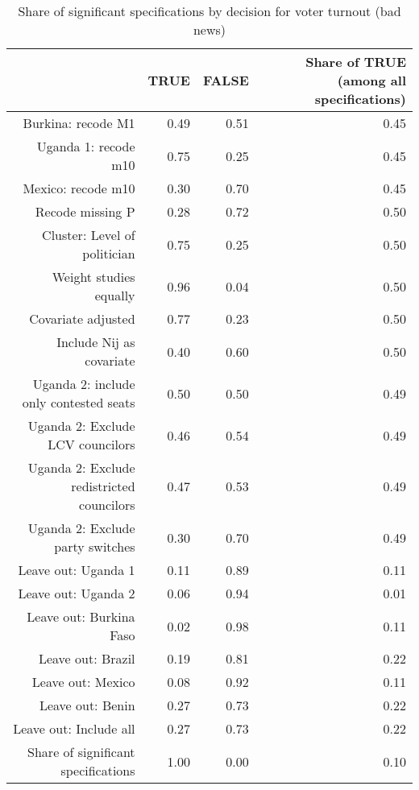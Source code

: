 \begin{table}[ht]
\centering
\caption{Share of significant specifications by decision for voter turnout (bad news)} 
\label{tab:spec_m3b}
\begin{tabular}{rrrr}
  \hline
 & TRUE & FALSE & Share of TRUE (among all specifications) \\ 
  \hline
Burkina: recode M1 & 0.49 & 0.51 & 0.45 \\ 
  Uganda 1: recode m10 & 0.75 & 0.25 & 0.45 \\ 
  Mexico: recode m10 & 0.30 & 0.70 & 0.45 \\ 
  Recode missing P & 0.28 & 0.72 & 0.50 \\ 
  Cluster: Level of politician & 0.75 & 0.25 & 0.50 \\ 
  Weight studies equally & 0.96 & 0.04 & 0.50 \\ 
  Covariate adjusted & 0.77 & 0.23 & 0.50 \\ 
  Include Nij as covariate & 0.40 & 0.60 & 0.50 \\ 
  Uganda 2: include only contested seats & 0.50 & 0.50 & 0.49 \\ 
  Uganda 2: Exclude LCV councilors & 0.46 & 0.54 & 0.49 \\ 
  Uganda 2: Exclude redistricted councilors & 0.47 & 0.53 & 0.49 \\ 
  Uganda 2: Exclude party switches & 0.30 & 0.70 & 0.49 \\ 
  Leave out: Uganda 1 & 0.11 & 0.89 & 0.11 \\ 
  Leave out: Uganda 2 & 0.06 & 0.94 & 0.01 \\ 
  Leave out: Burkina Faso & 0.02 & 0.98 & 0.11 \\ 
  Leave out: Brazil & 0.19 & 0.81 & 0.22 \\ 
  Leave out: Mexico & 0.08 & 0.92 & 0.11 \\ 
  Leave out: Benin & 0.27 & 0.73 & 0.22 \\ 
  Leave out: Include all & 0.27 & 0.73 & 0.22 \\ 
  Share of significant specifications & 1.00 & 0.00 & 0.10 \\ 
   \hline
\end{tabular}
\end{table}
